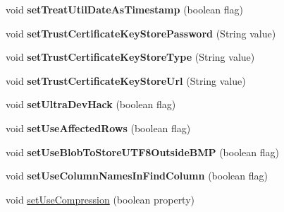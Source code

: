 \begin{DoxyCompactItemize}
void {\bfseries set\+Treat\+Util\+Date\+As\+Timestamp} (boolean flag)
\item 
\mbox{\label{classcom_1_1mysql_1_1jdbc_1_1_multi_host_my_s_q_l_connection_a3bc65c18b8dbef515d8a8d4bb3016fe6}} 
void {\bfseries set\+Trust\+Certificate\+Key\+Store\+Password} (String value)
\item 
\mbox{\label{classcom_1_1mysql_1_1jdbc_1_1_multi_host_my_s_q_l_connection_a877192c5ea4bc232ec63dc1af7daffc9}} 
void {\bfseries set\+Trust\+Certificate\+Key\+Store\+Type} (String value)
\item 
\mbox{\label{classcom_1_1mysql_1_1jdbc_1_1_multi_host_my_s_q_l_connection_a318f0a63872ac4a1772b73dc3ec70506}} 
void {\bfseries set\+Trust\+Certificate\+Key\+Store\+Url} (String value)
\item 
\mbox{\label{classcom_1_1mysql_1_1jdbc_1_1_multi_host_my_s_q_l_connection_afc398f281056a1167a47516e72caff6d}} 
void {\bfseries set\+Ultra\+Dev\+Hack} (boolean flag)
\item 
\mbox{\label{classcom_1_1mysql_1_1jdbc_1_1_multi_host_my_s_q_l_connection_a09ba36a364bb204ef860ffa8dae58a05}} 
void {\bfseries set\+Use\+Affected\+Rows} (boolean flag)
\item 
\mbox{\label{classcom_1_1mysql_1_1jdbc_1_1_multi_host_my_s_q_l_connection_ada5b147d77c534dbd5edc412f4ff56c5}} 
void {\bfseries set\+Use\+Blob\+To\+Store\+U\+T\+F8\+Outside\+B\+MP} (boolean flag)
\item 
\mbox{\label{classcom_1_1mysql_1_1jdbc_1_1_multi_host_my_s_q_l_connection_a0b83c95960af007876ddeecfee387a5f}} 
void {\bfseries set\+Use\+Column\+Names\+In\+Find\+Column} (boolean flag)
\item 
void \mbox{\hyperlink{classcom_1_1mysql_1_1jdbc_1_1_multi_host_my_s_q_l_connection_ac6291b99cbc9ae36778e00c3c95603b2}{set\+Use\+Compression}} (boolean property)

\end{DoxyCompactItemize}

